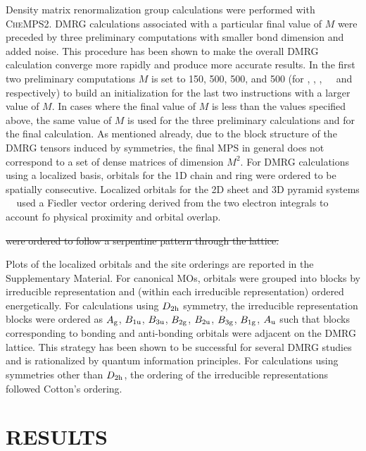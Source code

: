 \documentclass[aip,jcp,amsmath,amssymb, preprint]{revtex4-1}
\newcommand{\add}[1]{\colorbox{goodgreen}{\textcolor{white}{\footnotesize  \fontfamily{phv}\selectfont +}}
    \textcolor{goodgreen}{{#1}}\xspace}
\newcommand{\addnew}[1]{\colorbox{goodorange}{\textcolor{white}{\footnotesize  \fontfamily{phv}\selectfont +}}
\textcolor{goodorange}{{#1}}\xspace
}
\newcommand{\remove}[1]{
\colorbox{goodred}{\textcolor{white}{\footnotesize  \fontfamily{phv}\selectfont \textminus\vphantom{c}}}
\textcolor{goodred}{\sout{#1}}\xspace
}
\begin{document}
Density matrix renormalization group calculations were performed with \textsc{CheMPS2}.\cite{Wouters2014Chemps2}
DMRG calculations associated with a particular final value of $M$ were preceded by three preliminary computations with smaller bond dimension and added noise. 
This procedure has been shown to make the overall DMRG calculation converge more rapidly and produce more accurate results.\cite{Chan2002HighlyCorrelated, Moritz2006ConstructionOf}   
In the first two preliminary computations $M$ is set to 150, 500, 500, and 500 (for , , , \add{and } respectively) to build an initialization for the last two instructions with a larger value of $M$. 
In cases where the final value of $M$ is less than the values specified above, the same value of $M$ is used for the three preliminary calculations and for the final calculation.
As mentioned already, due to the block structure of the DMRG tensors induced by symmetries, the final MPS in general does not correspond to a set of dense matrices of dimension $M^2$.
For DMRG calculations using a localized basis, orbitals for the 1D chain and ring were ordered to be spatially consecutive.  
Localized orbitals for the 2D sheet and 3D pyramid systems \addnew{used a Fiedler vector ordering derived from the two electron integrals to account fo physical proximity and orbital overlap.\cite{Olivares2015TheAbinitio}}\remove{were ordered to follow a serpentine pattern through the lattice.}
Plots of the localized orbitals and the site orderings are reported in the Supplementary Material.
For canonical MOs, orbitals were grouped into blocks by irreducible representation and (within each irreducible representation) ordered energetically.
For calculations using $D_{\rm{2h}}$ symmetry, the irreducible representation blocks were ordered as $A_{\rm g}$, $B_{\rm  1u}$, $B_{\rm  3u}$, $B_{\rm  2g}$, $B_{\rm  2u}$, $B_{\rm  3g}$,  $B_{\rm 1g}$, $A_{\rm  u}$ such that blocks corresponding to bonding and anti-bonding orbitals were adjacent on the DMRG lattice.  
This strategy has been shown to be successful for several DMRG studies\cite{Yanai2010MultireferenceQuantum, Kurashige2009HighPerformance, Barcza2011QuantumInfromation, Boguslawski2012EntanglementMeasures} and is rationalized by quantum information principles.\cite{Rissler2006MeasuringOrbital} 
For calculations using symmetries other than $D_{\rm{2h}}$, the ordering of the irreducible representations followed Cotton's ordering.



\section{RESULTS}
\label{sec:results}
\end{document}
